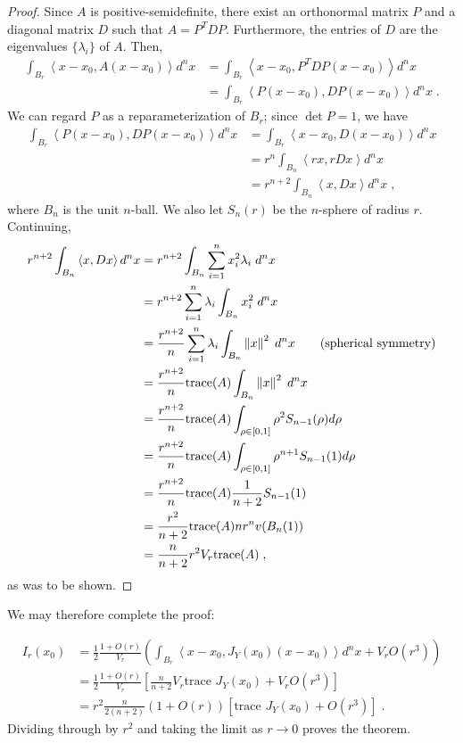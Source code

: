 	\begin{proof}
		Since $A$ is positive-semidefinite, there exist an orthonormal matrix $P$ and a diagonal matrix $D$ such that $A = P^TDP$. Furthermore, the entries of $D$ are the eigenvalues $\{\lambda_i\}$ of $A$. Then, 
		\begin{align}
			\int_{B_r} \left< x - x_0, A(x-x_0) \right> d^n x &= \int_{B_r} \left< x - x_0, P^T DP(x-x_0) \right> d^n x\\
			&= \int_{B_r} \left< P(x - x_0),  DP(x-x_0) \right> d^n x \;.
		\end{align}
		We can regard $P$ as a reparameterization of $B_r$; since $\det P = 1$, we have 
		\begin{align}
			\int_{B_r} \left< P(x - x_0),  DP(x-x_0) \right> d^n x &= \int_{B_r} \left< x - x_0,  D(x-x_0) \right> d^n x \\
			&= r^n\int_{B_n} \left< rx, rDx \right> d^n x \\
			&= r^{n+2}\int_{B_n} \left< x, Dx \right> d^n x \;,
		\end{align}
		where $B_n$ is the unit $n$-ball. We also let $S_n(r)$ be the $n$-sphere of radius $r$. Continuing, 
		\begin{align}
			r^{n+2}\int_{B_n} \left< x, Dx \right> d^n x &= r^{n+2} \int_{B_n} \sum_{i= 1}^n x_i^2 \lambda_i \; d^nx \\
			&= r^{n+2} \sum_{i = 1}^n \lambda _i \int_{B_n} x_i^2 \; d^nx \\
			&= \frac{r^{n+2}}{n} \sum_{i = 1}^n \lambda _i \int_{B_n} \left\lVert x\right\rVert^2 \; d^nx \tag{spherical symmetry} \\
			&= \frac{r^{n+2}}{n} \text{trace}(A)  \int_{B_n} \left\lVert x\right\rVert^2 \; d^nx \\ 
			&= \frac{r^{n+2}}{n} \text{trace} (A) \int_{\rho \in [0,1]} \rho^2 S_{n-1}(\rho) d\rho \\
			&= \frac{r^{n+2}}{n} \text{trace} (A) \int_{\rho \in [0,1]} \rho^{n+1} S_{n-1}(1) d\rho \\
			&= \frac{r^{n+2}}{n} \text{trace} (A)  \frac{1}{n+2} S_{n-1}(1) \\
			&= \frac{r^2}{n+2}  \text{trace} (A)  n r^{n}v(B_n(1)) \\
			&= \frac{n}{n+2} r^{2} V_r \text{trace} (A)\;,
		\end{align}
		as was to be shown. 
	\end{proof}

	We may therefore complete the proof: 

	\begin{align}
		I_r(x_0) &= \frac{1}{2}\frac{1 + O(r)}{V_r} \left(\int_{B_r}  \left<x - x_0, J_Y(x_0)(x - x_0)\right> d^n x + V_rO(r^3)\right) \\ 
		&= \frac{1}{2}\frac{1 + O(r)}{V_r} \left[\frac{n}{n+2} V_r \text{trace } J_Y(x_0) + V_rO(r^3)\right] \\
		&= r^2 \frac{n}{2(n+2)} \left(1 + O(r)\right)\left[\text{trace }J_Y(x_0) + O(r^3) \right]\;.
	\end{align}
	Dividing through by $r^2$ and taking the limit as $r\rightarrow 0$ proves the theorem.

